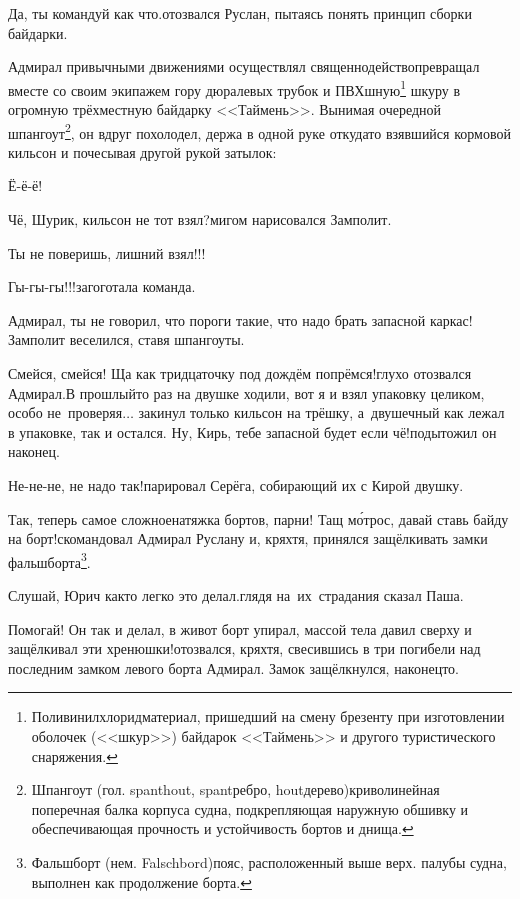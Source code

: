 \diagdash Да, ты командуй как что.\mdash отозвался Руслан, пытаясь понять принцип сборки байдарки.

Адмирал привычными движениями осуществлял священнодейство\mdash превращал вместе со своим экипажем гору дюралевых трубок и ПВХ\sdash шную\footnote{Поливинилхлорид\mdash материал, пришедший на смену брезенту при изготовлении оболочек (<<шкур>>) байдарок <<Таймень>> и другого туристического снаряжения.} шкуру в огромную трёхместную байдарку <<Таймень>>. Вынимая очередной шпангоут\footnote{Шпангоут (гол. spanthout, spant\mdash ребро, hout\mdash дерево)\mdash криволинейная поперечная балка корпуса судна, подкрепляющая наружную обшивку и обеспечивающая прочность и устойчивость бортов и днища\cite{МорскойСправочник}.}, он вдруг похолодел, держа в одной руке откуда\sdash то взявшийся кормовой кильсон и почесывая другой рукой затылок:

\diagdash Ё-ё-ё!

\diagdash Чё, Шурик, кильсон не тот взял?\mdash мигом нарисовался Замполит.

\diagdash Ты не поверишь, лишний взял!!!

\diagdash Гы-гы-гы!!!\mdash загоготала команда.

\diagdash Адмирал, ты не говорил, что пороги такие, что надо брать запасной каркас!\mdash Замполит веселился, ставя шпангоуты.

\diagdash Смейся, смейся! Ща как тридцаточку под дождём попрёмся!\mdash глухо отозвался Адмирал.\mdash В прошлый\sdash то раз на двушке ходили, вот я и взял упаковку целиком, особо не~проверяя$\ldots$ закинул только кильсон на трёшку, а~двушечный как лежал в упаковке, так и остался. Ну, Кирь, тебе запасной будет если чё!\mdash подытожил он наконец.

\diagdash Не-не-не, не надо так!\mdash парировал Серёга, собирающий их с Кирой двушку.

\setcounter{footnote}{0}
\diagdash Так, теперь самое сложное\mdash натяжка бортов, парни! Тащ м\'{о}трос, давай ставь байду на борт!\mdash скомандовал Адмирал Руслану и, кряхтя, принялся защёлкивать замки фальшборта\footnote{Фальшборт (нем. Falschbord)\mdash пояс, расположенный выше верх. палубы судна, выполнен как продолжение борта\cite{МорскойСправочник}.}.

\diagdash Слушай, Юрич как\sdash то легко это делал.\mdash глядя на~их~страдания сказал Паша.

\diagdash Помогай! Он так и делал, в живот борт упирал, массой тела давил сверху и защёлкивал эти хренюшки!\mdash отозвался, кряхтя, свесившись в три погибели над последним замком левого борта Адмирал. Замок защёлкнулся, наконец\sdash то.

